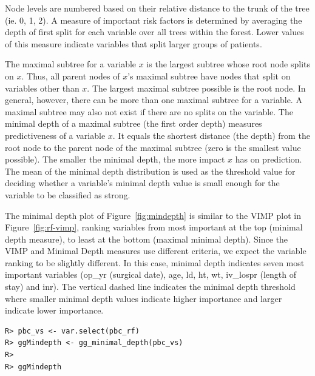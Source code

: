\documentclass[nojss]{jss}\usepackage[]{graphicx}\usepackage[]{color}
\makeatletter
\newenvironment{kframe}{%
 \def\at@end@of@kframe{}%
 \ifinner\ifhmode%
  \def\at@end@of@kframe{\end{minipage}}%
  \begin{minipage}{\columnwidth}%
 \fi\fi%
 \def\FrameCommand##1{\hskip\@totalleftmargin \hskip-\fboxsep
 \colorbox{shadecolor}{##1}\hskip-\fboxsep
     \hskip-\linewidth \hskip-\@totalleftmargin \hskip\columnwidth}%
 \MakeFramed {\advance\hsize-\width
   \@totalleftmargin\z@ \linewidth\hsize
   \@setminipage}}%
 {\par\unskip\endMakeFramed%
 \at@end@of@kframe}
\newenvironment{knitrout}{}{} %
\makeatother
\begin{document}
Node levels are numbered based on their relative distance to the trunk of the tree (ie. 0, 1, 2).  A measure of important risk factors is determined by averaging the depth of first split for each variable over all trees within the forest. Lower values of this measure indicate variables that split larger groups of patients. 

The maximal subtree for a variable $x$ is the largest subtree whose root node splits on $x$. Thus, all parent nodes of $x$'s maximal subtree have nodes that split on variables other than $x$. The largest maximal subtree possible is the root node. In general, however, there can be more than one maximal subtree for a variable. A maximal subtree may also not exist if there are no splits on the variable. The minimal depth of a maximal subtree (the first order depth) measures predictiveness of a variable $x$. It equals the shortest distance (the depth) from the root node to the parent node of the maximal subtree (zero is the smallest value possible). The smaller the minimal depth, the more impact $x$ has on prediction. The mean of the minimal depth distribution is used as the threshold value for deciding whether a variable's minimal depth value is small enough for the variable to be classified as strong. 

The minimal depth plot of Figure~\ref{fig:mindepth} is similar to the VIMP plot in Figure~\ref{fig:rf-vimp}, ranking variables from most important at the top (minimal depth measure), to least at the bottom (maximal minimal depth). Since the VIMP and Minimal Depth measures use different criteria, we expect the variable ranking to be slightly different. In this case, minimal depth indicates seven most important variables (op\_yr (surgical date), age, ld, ht, wt, iv\_lospr (length of stay) and inr). The vertical dashed line indicates the minimal depth threshold where smaller minimal depth values indicate higher importance and larger indicate lower importance.


\begin{knitrout}\footnotesize
{}\color{fgcolor}\begin{kframe}
\begin{verbatim}
R> pbc_vs <- var.select(pbc_rf)
R> ggMindepth <- gg_minimal_depth(pbc_vs)
R> 
R> ggMindepth
\end{verbatim}
\end{kframe}
\end{knitrout}
\end{document}
